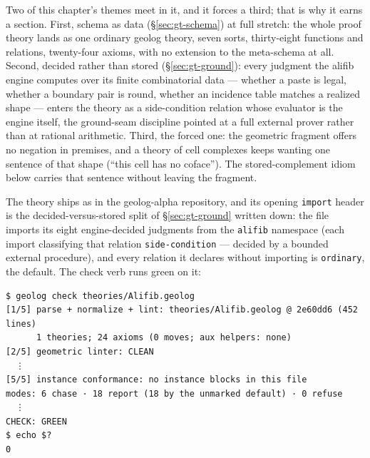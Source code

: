 Two of this chapter's themes meet in it, and it forces a third; that
is why it earns a section. First, schema as data
(\S\ref{sec:gt-schema}) at full
stretch: the whole proof theory lands as one ordinary geolog theory,
seven sorts, thirty-eight functions and relations, twenty-four axioms,
with no extension to the meta-schema at all. Second, decided rather
than stored (\S\ref{sec:gt-ground}): every judgment the alifib engine
computes over its finite combinatorial data --- whether a paste is
legal, whether a boundary pair is round, whether an incidence table
matches a realized shape --- enters the theory as a side-condition
relation whose evaluator is the engine itself, the ground-seam
discipline pointed at a full external prover rather than at rational
arithmetic. Third, the forced one: the geometric fragment offers no
negation in premises, and a theory of cell complexes keeps wanting one sentence of that shape (``this cell has no
coface''). The stored-complement idiom below carries that sentence
without leaving the fragment.

The theory ships as  in the geolog-alpha
repository, and its opening \texttt{import} header is the
decided-versus-stored split of \S\ref{sec:gt-ground} written down:
the file imports its eight engine-decided judgments from the
\texttt{alifib} namespace (each import classifying that relation
\texttt{side-condition} --- decided by a bounded external procedure),
and every relation it declares without importing is
\texttt{ordinary}, the default. The check verb runs green on it:

\begin{Verbatim}[fontsize=\small,frame=leftline,rulecolor=\color{accentmid},framesep=3mm,xleftmargin=3mm]
$ geolog check theories/Alifib.geolog
[1/5] parse + normalize + lint: theories/Alifib.geolog @ 2e60dd6 (452 lines)
      1 theories; 24 axioms (0 moves; aux helpers: none)
[2/5] geometric linter: CLEAN
  ⋮
[5/5] instance conformance: no instance blocks in this file
modes: 6 chase · 18 report (18 by the unmarked default) · 0 refuse
  ⋮
CHECK: GREEN
$ echo $?
0
\end{Verbatim}

